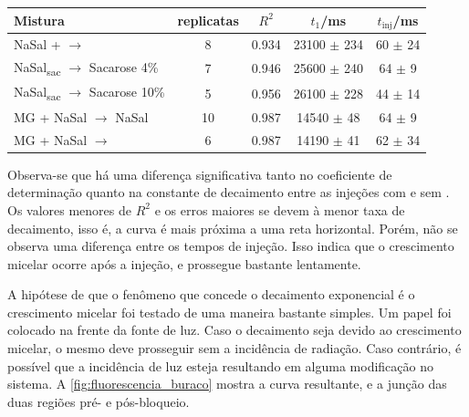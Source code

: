 	\begin{table}[h]
		{%
			\begin{tabular}{p{4cm} c c c c}
				\toprule
				Mistura                                        & replicatas & \(R^2\) & \(t_1\)/ms        & \(t_{\mathrm{inj}}\)/ms \\ \midrule
				NaSal + \agua{} \(\to\) \agua                  & 8          & 0.934   & 23100 \(\pm\) 234 & 60 \(\pm\) 24           \\
				NaSal\textsubscript{sac} \(\to\) Sacarose 4\%  & 7          & 0.946   & 25600 \(\pm\) 240 & 64 \(\pm\) 9            \\
				NaSal\textsubscript{sac} \(\to\) Sacarose 10\% & 5          & 0.956   & 26100 \(\pm\) 228 & 44 \(\pm\) 14           \\ \midrule
				MG + NaSal \(\to\) NaSal                       & 10         & 0.987   & 14540 \(\pm\) 48  & 64 \(\pm\) 9            \\
				MG + NaSal \(\to\) \agua                       & 6          & 0.987   & 14190 \(\pm\) 41  & 62 \(\pm\) 34           \\ \bottomrule
			\end{tabular}
		}{}
	\end{table} 
	
	Observa-se que há uma diferença significativa tanto no coeficiente de determinação quanto na constante de decaimento entre as injeções com e sem \TTAB{}. Os valores menores de \(R^2\) e os erros maiores se devem à menor taxa de decaimento, isso é, a curva é mais próxima a uma reta horizontal.  Porém, não se observa uma diferença entre os tempos de injeção. Isso indica que o crescimento micelar ocorre após a injeção, e prossegue bastante lentamente.
	
	A hipótese de que o fenômeno que concede o decaimento exponencial é o crescimento micelar foi testado de uma maneira bastante simples. Um papel foi colocado na frente da fonte de luz. Caso o decaimento seja devido ao crescimento micelar, o mesmo deve prosseguir sem a incidência de radiação. Caso contrário, é possível que a incidência de luz esteja resultando em alguma modificação no sistema. A \autoref{fig:fluorescencia_buraco} mostra a curva resultante, e a junção das duas regiões pré- e pós-bloqueio.
	
